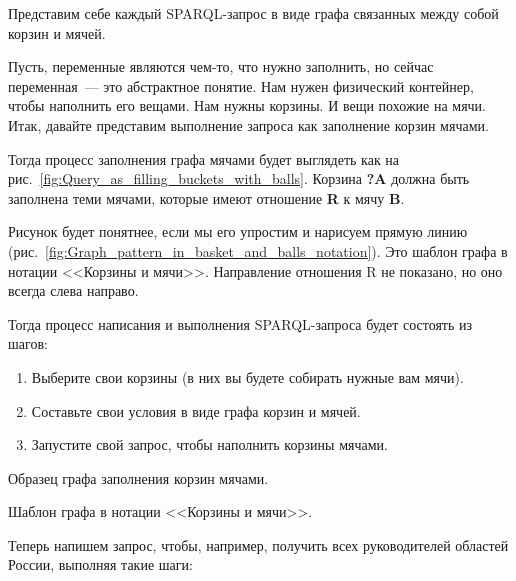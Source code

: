 Представим себе каждый SPARQL-запрос в виде графа связанных между собой корзин и мячей.

Пусть, переменные являются чем-то, что нужно заполнить, но сейчас переменная~--- это абстрактное понятие. Нам нужен физический контейнер, чтобы наполнить его вещами. Нам нужны корзины. И вещи похожие на мячи. Итак, давайте представим выполнение запроса как заполнение корзин мячами.

Тогда процесс заполнения графа мячами будет выглядеть как на рис.~\ref{fig:Query_as_filling_buckets_with_balls}. Корзина \textbf{?A} должна быть заполнена теми мячами, которые имеют отношение \textbf{R} к мячу \textbf{B}.

Рисунок будет понятнее, если мы его упростим и нарисуем прямую линию (рис.~\ref{fig:Graph_pattern_in_basket_and_balls_notation}). Это шаблон графа в нотации <<Корзины и мячи>>. Направление отношения R не показано, но оно всегда слева направо.

\newpage
Тогда процесс написания и выполнения SPARQL-запроса будет состоять из шагов:
\begin{enumerate}
    \item Выберите свои корзины (в них вы будете собирать нужные вам мячи).
    \item Составьте свои условия в виде графа корзин и мячей.
    \item Запустите свой запрос, чтобы наполнить корзины мячами.
\end{enumerate}

\begin{marginfigure}[-4cm]
	{
		\setlength{\fboxsep}{0pt}%
		\setlength{\fboxrule}{1pt}%
	}
    \caption{Образец графа заполнения корзин мячами.}
	\label{fig:Query_as_filling_buckets_with_balls}
\end{marginfigure}

\begin{marginfigure}
	{
		\setlength{\fboxsep}{0pt}%
		\setlength{\fboxrule}{1pt}%
	}
    \caption{Шаблон графа в нотации <<Корзины и мячи>>.}
	\label{fig:Graph_pattern_in_basket_and_balls_notation}
\end{marginfigure}

Теперь напишем запрос, чтобы, например, получить всех руководителей областей России, выполняя такие шаги:

